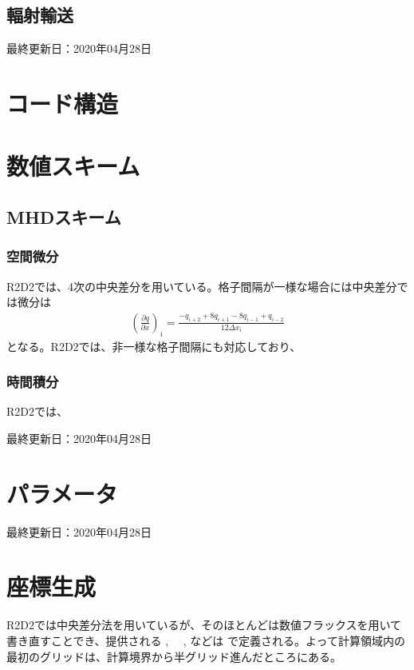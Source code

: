 \documentclass[letterpaper,10pt,dvipdfmx,report]{sphinxmanual}
\begin{document}
\section{輻射輸送}
\label{\detokenize{equation:id3}}
最終更新日：2020年04月28日


\chapter{コード構造}
\label{\detokenize{code:id1}}\label{\detokenize{code::doc}}

\chapter{数値スキーム}
\label{\detokenize{scheme:id1}}\label{\detokenize{scheme::doc}}

\section{MHDスキーム}
\label{\detokenize{scheme:mhd}}

\subsection{空間微分}
\label{\detokenize{scheme:id2}}
R2D2では、4次の中央差分を用いている。格子間隔が一様な場合には中央差分では微分は
\begin{equation*}
\begin{split}\left(\frac{\partial q}{\partial x}\right)_i =\frac{-q_{i+2}+8q_{i+1}-8q_{i-1}+q_{i-2}}{12\Delta x_i}\end{split}
\end{equation*}
となる。R2D2では、非一様な格子間隔にも対応しており、


\subsection{時間積分}
\label{\detokenize{scheme:id3}}
R2D2では、

最終更新日：2020年04月28日


\chapter{パラメータ}
\label{\detokenize{parameter:id1}}\label{\detokenize{parameter::doc}}
最終更新日：2020年04月28日


\chapter{座標生成}
\label{\detokenize{geometry:id1}}\label{\detokenize{geometry::doc}}
R2D2では中央差分法を用いているが、そのほとんどは数値フラックスを用いて書き直すことでき、提供される  , 　,  などは  で定義される。よって計算領域内の最初のグリッドは、計算境界から半グリッド進んだところにある。
\end{document}

